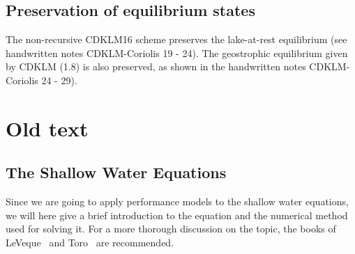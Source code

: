 \documentclass[11pt, a4paper]{article}
\newcommand{\red}[1]{{\color{red}#1}}
\begin{document}
\subsection{Preservation of equilibrium states}

The non-recursive CDKLM16 scheme preserves the lake-at-rest equilibrium (\red{see handwritten notes CDKLM-Coriolis 19 - 24}).
The geostrophic equilibrium given by CDKLM (1.8) is also preserved, \red{as shown in the handwritten notes CDKLM-Coriolis 24 - 29}).

	




\section{Old text}
\subsection{The Shallow Water Equations}
\label{sec:swe}
Since we are going to apply performance models to the shallow water equations, we will here give a brief introduction to the equation and the numerical method used for solving it.
For a more thorough discussion on the topic, the books of LeVeque~\cite{LevequeFVM2004} and Toro~\cite{toroSWE2001} are recommended.
\end{document}
